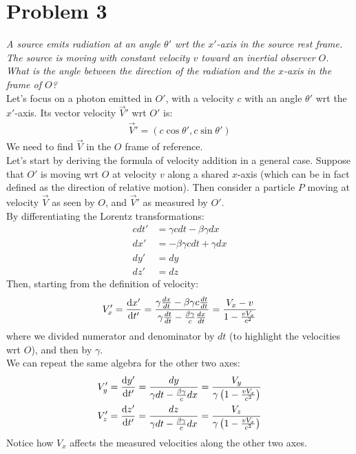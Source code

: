 \documentclass[../template.tex]{subfiles}
\begin{document}
\section{Problem 3}
\textit{A source emits radiation at an angle $\theta'$ wrt the $x'$-axis in the source rest frame. The source is moving with constant velocity $v$ toward an inertial observer $O$.}\\
\textit{What is the angle between the direction of the radiation and the $x$-axis in the frame of $O$?}\\

Let's focus on a photon emitted in $O'$, with a velocity $c$ with an angle $\theta'$ wrt the $x'$-axis. Its vector velocity $\vec{V}'$  wrt $O'$ is:
\begin{align*}
    \vec{V}' = (c \cos \theta', c \sin \theta')
\end{align*}
We need to find $\vec{V}$ in the $O$ frame of reference.\\

Let's start by deriving the formula of velocity addition in a general case. Suppose that $O'$ is moving wrt $O$ at velocity $v$ along a shared $x$-axis (which can be in fact defined as the direction of relative motion). Then consider a particle $P$ moving at velocity $\vec{V}$ as seen by $O$, and $\vec{V}'$ as measured by $O'$.\\
By differentiating the Lorentz transformations:
\begin{align*}
    cdt' &= \gamma c dt - \beta \gamma dx \\
    dx' &= -\beta \gamma c dt + \gamma dx \\
    dy' &=  dy \\
    dz' &=  dz
\end{align*}
Then, starting from the definition of velocity:
\begin{align*}
    V_x' = \dv{x'}{t'} = \frac{\gamma \frac{dx}{dt} - \beta \gamma c \frac{dt}{dt}  }{\gamma \frac{dt}{dt} - \frac{\beta \gamma}{c} \frac{dx}{dt}   }  = \frac{V_x - v}{1-\frac{vV_x}{c^2}}   
\end{align*}
where we divided numerator and denominator by $dt$ (to highlight the velocities wrt $O$), and then by $\gamma$.\\
We can repeat the same algebra for the other two axes:
\begin{align*}
    V_y' &=  \dv{y'}{t'} = \frac{dy}{\gamma dt - \frac{\beta \gamma}{c} dx } = \frac{V_y}{\gamma \left(1-\frac{v V_x}{c^2} \right)}    \\
    V_z' &= \dv{z'}{t'} = \frac{dz}{\gamma dt - \frac{\beta \gamma }{c} dx } = \frac{V_z}{\gamma \left(1-\frac{vV_x}{c^2} \right)}   \\
\end{align*}
Notice how $V_x$ affects the measured velocities along the other two axes.\\
\end{document}
